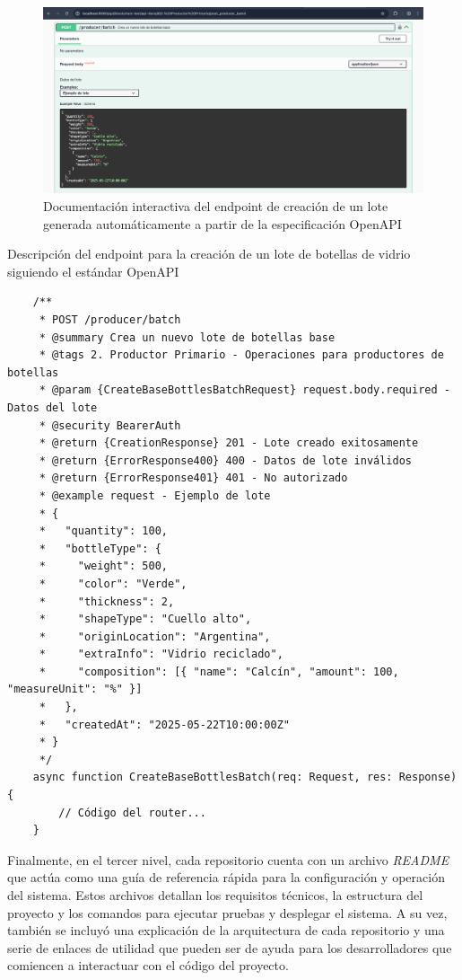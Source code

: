 \begin{figure}[!htb]
	\centering
	\includegraphics[width=\textwidth]{Figures/openapi-endpoint.png}
	\caption{Documentación interactiva del endpoint de creación de un lote generada automáticamente a partir de la especificación OpenAPI}
	\label{fig:openapi-docs}
\end{figure}


\begin{listing}[!tp]
\caption{Descripción del endpoint para la creación de un lote de botellas de vidrio siguiendo el estándar OpenAPI}
\label{listing:openapi-create-batch-code}
\begin{verbatim}
	/**
	 * POST /producer/batch
	 * @summary Crea un nuevo lote de botellas base
	 * @tags 2. Productor Primario - Operaciones para productores de botellas
	 * @param {CreateBaseBottlesBatchRequest} request.body.required - Datos del lote
	 * @security BearerAuth
	 * @return {CreationResponse} 201 - Lote creado exitosamente
	 * @return {ErrorResponse400} 400 - Datos de lote inválidos
	 * @return {ErrorResponse401} 401 - No autorizado
	 * @example request - Ejemplo de lote
	 * {
	 *   "quantity": 100,
	 *   "bottleType": {
	 *     "weight": 500,
	 *     "color": "Verde",
	 *     "thickness": 2,
	 *     "shapeType": "Cuello alto",
	 *     "originLocation": "Argentina",
	 *     "extraInfo": "Vidrio reciclado",
	 *     "composition": [{ "name": "Calcín", "amount": 100, "measureUnit": "%" }]
	 *   },
	 *   "createdAt": "2025-05-22T10:00:00Z"
	 * }
	 */
	async function CreateBaseBottlesBatch(req: Request, res: Response) {
		// Código del router...
	}
\end{verbatim}
\end{listing}

Finalmente, en el tercer nivel, cada repositorio cuenta con un archivo \textit{README} que actúa como una guía de referencia rápida para la configuración y operación del sistema. Estos archivos detallan los requisitos técnicos, la estructura del proyecto y los comandos para ejecutar pruebas y desplegar el sistema. A su vez, también se incluyó una explicación de la arquitectura de cada repositorio y una serie de enlaces de utilidad que pueden ser de ayuda para los desarrolladores que comiencen a interactuar con el código del proyecto.

